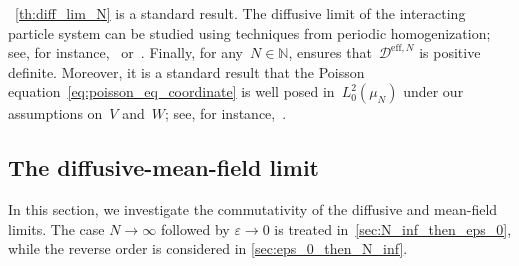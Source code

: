 \documentclass[onefignum,onetabnum]{siamart251216} %
\newcommand{\mc}[1]{\mathcal{#1}}
\newcommand{\mescin}{\mu}
\newcommand{\DeffN}{\mc{D}^{\mathrm{eff},N}}
\theoremstyle{plain}
\numberwithin{equation}{section}
\numberwithin{theorem}{section}
\begin{document}
~\cref{th:diff_lim_N} is a standard result. The diffusive limit of the interacting particle system can be studied using techniques from periodic homogenization; see, for instance,~\cite[Theorem 13.1]{komorowski2012fluctuations} or~\cite{bensoussan2011asymptotic,papanicolaou1985ohrnstein,hairer2004periodic,hairer2008ballistic}. Finally, for any~$N \in \mathbb{N}$, \cite[Lemma~6.11]{PavliotisStochasticProcesses2014} ensures that~$\DeffN$ is positive definite. Moreover, it is a standard result that the Poisson equation~\eqref{eq:poisson_eq_coordinate} is well posed in~$L^2_0(\mescin_N)$ under our assumptions on~$V$ and~$W$; see, for instance,~\cite[Section 3.1.3]{lelievre2016partial}.
%
\subsection{The diffusive-mean-field limit}
\label{sec:diff-mean-field}
In this section, we investigate the commutativity of the diffusive and mean-field limits. The case $N \to \infty$ followed by $\varepsilon \to 0$ is treated in~\cref{sec:N_inf_then_eps_0}, while the reverse order is considered in \cref{sec:eps_0_then_N_inf}.
\end{document}
